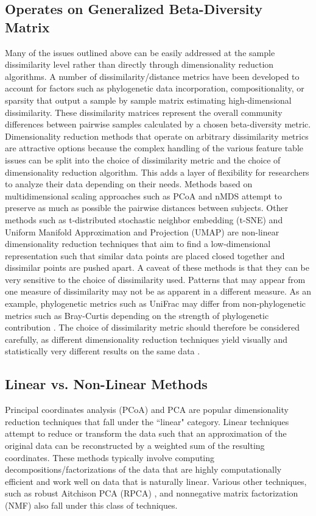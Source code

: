 \subsection{Operates on Generalized Beta-Diversity Matrix} Many of the issues outlined above can be easily addressed at the sample dissimilarity level rather than directly through dimensionality reduction algorithms. A number of dissimilarity/distance metrics have been developed to account for factors such as phylogenetic data incorporation, compositionality, or sparsity that output a sample by sample matrix estimating high-dimensional dissimilarity. These dissimilarity matrices represent the overall community differences between pairwise samples calculated by a chosen beta-diversity metric. Dimensionality reduction methods that operate on arbitrary dissimilarity metrics are attractive options because the complex handling of the various feature table issues can be split into the choice of dissimilarity metric and the choice of dimensionality reduction algorithm. This adds a layer of flexibility for researchers to analyze their data depending on their needs. Methods based on multidimensional scaling approaches such as PCoA \cite{Kruskal1978-xx} and nMDS \cite{Kruskal1964-dn}attempt to preserve as much as possible the pairwise distances between subjects. Other methods such as t-distributed stochastic neighbor embedding (t-SNE) \cite{Van_der_Maaten2008-af} and Uniform Manifold Approximation and Projection (UMAP) \cite{McInnes2018-zd} are non-linear dimensionality reduction techniques that aim to find a low-dimensional representation such that similar data points are placed closed together and dissimilar points are pushed apart. A caveat of these methods is that they can be very sensitive to the choice of dissimilarity used. Patterns that may appear from one measure of dissimilarity may not be as apparent in a different measure. As an example, phylogenetic metrics such as UniFrac may differ from non-phylogenetic metrics such as Bray-Curtis depending on the strength of phylogenetic contribution \cite{Shankar2017-af}. The choice of dissimilarity metric should therefore be considered carefully, as different dimensionality reduction techniques yield visually and statistically very different results on the same data \cite{Kuczynski2011-yx}.

\subsection{Linear vs. Non-Linear Methods} Principal coordinates analysis (PCoA) and PCA are popular dimensionality reduction techniques that fall under the ``linear" category. Linear techniques attempt to reduce or transform the data such that an approximation of the original data can be reconstructed by a weighted sum of the resulting coordinates. These methods typically involve computing decompositions/factorizations of the data that are highly computationally efficient and work well on data that is naturally linear. Various other techniques, such as robust Aitchison PCA (RPCA) \cite{Martino2019-op}, and nonnegative matrix factorization (NMF) \cite{Lee1999-bu} also fall under this class of techniques.

